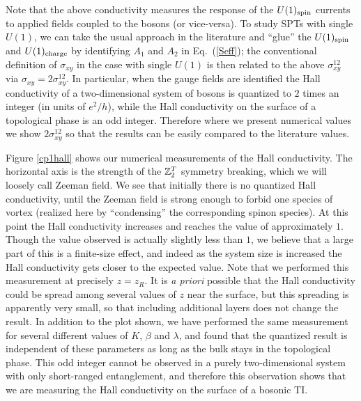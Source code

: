 Note that the above conductivity measures the response of the $U(1)_{\rm spin}$ currents to applied fields coupled to the bosons (or vice-versa). To study SPTs with single $U(1)$, we can take the usual approach in the literature\cite{SenthilVishwanath} and ``glue'' the $U(1)_{\rm spin}$ and $U(1)_{\rm charge}$ by identifying $A_1$ and $A_2$ in Eq.~(\ref{Seff}); the conventional definition of $\sigma_{xy}$ in the case with single $U(1)$ is then related to the above $\sigma_{xy}^{12}$ via $\sigma_{xy} = 2 \sigma_{xy}^{12}$.
In particular, when the gauge fields are identified the Hall conductivity of a two-dimensional system of bosons is quantized to $2$ times an integer (in units of $e^2/h$), while the Hall conductivity on the surface of a topological phase is an odd integer. Therefore where we present numerical values we show $2 \sigma^{12}_{xy}$ so that the results can be easily compared to the literature values.


Figure \ref{cp1hall} shows our numerical measurements of the Hall conductivity. The horizontal axis is the strength of the $\mathbb{Z}_2^T$ symmetry breaking, which we will loosely call Zeeman field. We see that initially there is no quantized Hall conductivity, until the Zeeman field is strong enough to forbid one species of vortex (realized here by ``condensing'' the corresponding spinon species). At this point the Hall conductivity increases and reaches the value of approximately $1$. Though the value observed is actually slightly less than $1$, we believe that a large part of this is a finite-size effect, and indeed as the system size is increased the Hall conductivity gets closer to the expected value.  Note that we performed this measurement at precisely $z=z_R$.  It is {\em a priori} possible that the Hall conductivity could be spread among several values of $z$ near the surface, but this spreading is apparently very small, so that including additional layers does not change the result. In addition to the plot shown, we have performed the same measurement for several different values of $K$, $\beta$ and $\lambda$, and found that the quantized result is independent of these parameters as long as the bulk stays in the topological phase. This odd integer cannot be observed in a purely two-dimensional system with only short-ranged entanglement, and therefore this observation shows that we are measuring the Hall conductivity on the surface of a bosonic TI.


